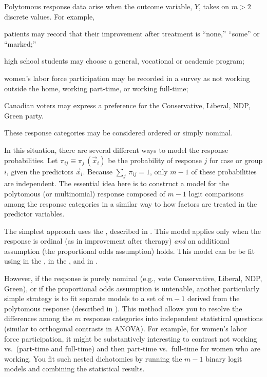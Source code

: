 \documentclass[11pt]{book}\usepackage[]{graphicx}\usepackage[]{color}
\begin{document}
Polytomous response data arise when the outcome variable, $Y$,
takes on $m > 2$ discrete values.  For example, 
\begin{seriate}
 \item patients may record that their improvement after treatment is ``none,''
``some'' or ``marked;''
 \item high school students may choose a general, vocational or
academic program;
 \item women's labor force participation may be recorded in a survey
 as not working outside the home, working part-time, or working full-time;
 \item Canadian voters may express a preference for
the Conservative, Liberal, NDP, Green party.
\end{seriate}
These response categories may be considered ordered or simply
nominal.

In this situation, there are several different
ways to model the response probabilities.  Let \(\pi_{ij} \equiv
\pi_j \,  ( \vec{x}_i )\) be the probability of response $j$ for case
or group $i$, given the predictors $\vec{x}_i$.
Because \(\sum_j \,  \pi_{ij} = 1\), only \(m - 1\) of
these probabilities are independent.  The essential idea here is to
construct a model for the polytomous (or multinomial)
response composed of $m-1$
logit comparisons among the response categories in a similar way
to how factors are treated in the predictor variables.

The simplest approach uses
the 
, described in .
This model applies only when the response is ordinal
(as in improvement after therapy)
\emph{and} an additional assumption
(the proportional odds assumption) holds. 
This model can be be fit using  in the ,
 in the , and  in .

However, if the
response is purely nominal (e.g., vote Conservative, Liberal, NDP, Green),
or if the proportional odds assumption is untenable, another particularly
simple strategy is to fit separate models to a set of \(m - 1\)
 derived from the polytomous response
(described in ). 
This method allows you to resolve the differences
among the $m$ response categories into independent statistical questions
(similar to orthogonal contrasts in ANOVA).
For example, for women's labor force participation, it might be 
substantively interesting to contrast not working vs.\  (part-time and full-time)
and then part-time vs.\ full-time for women who are working.
You fit such nested
dichotomies by running the $m-1$ binary logit models and combining the
statistical results.
\end{document}
